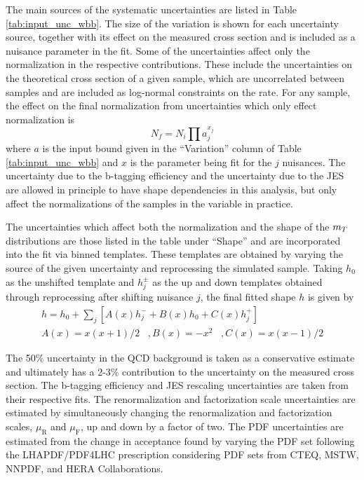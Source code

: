 The main sources of the systematic uncertainties are listed in Table \ref{tab:input_unc_wbb}.
The size of the variation is shown for each uncertainty source,
 together with its effect on the measured cross section
 and is included as a nuisance parameter in the fit.
Some of the uncertainties affect
 only the normalization in the respective contributions.
These include the uncertainties on the
 theoretical cross section of a given sample,
 which are uncorrelated between samples
 and are included as log-normal constraints on the rate.
For any sample, the effect on the final normalization
 from uncertainties which only effect normalization is 
\begin{equation}\label{eq:fitnorm}
N_f = N_i \prod a_{j}^{x_j}
\end{equation}
 where $a$ is the
 input bound given in the ``Variation'' column
 of Table \ref{tab:input_unc_wbb} and $x$ is the
 parameter being fit for the $j$ nuisances.
The uncertainty due to the b-tagging efficiency
 and the uncertainty due to the JES are allowed in
 principle to have shape dependencies in this analysis,
 but only affect the normalizations of the samples
 in the \mt variable in practice.

The uncertainties which affect both the normalization and the
 shape of the $m_T$ distributions
 are those listed in
 the table under ``Shape'' and are
 incorporated into the fit via binned templates.
These templates 
 are obtained by varying the source
 of the given uncertainty and reprocessing the simulated sample.
Taking $h_0$ as the unshifted template
 and $h_j^\pm$ as the up and down templates obtained through reprocessing
 after shifting nuisance $j$, the final fitted shape $h$ is given by
\begin{align}\label{eq:fitshape}
 h = h_0 + \sum_j[A(x)h^-_j + B(x)h_0 + C(x)h^+_j]\\
 A(x) = x(x+1)/2\;\;\;,
 B(x) = -x^2\;\;\;,
 C(x) = x(x-1)/2
\end{align}


The 50\% uncertainty in the QCD background is taken as a conservative estimate
 and ultimately has a 2-3\% contribution to the uncertainty on the measured cross section.
The b-tagging efficiency and JES rescaling uncertainties
 are taken from their respective fits.
The renormalization and factorization
 scale uncertainties are estimated by simultaneously
 changing the renormalization and factorization scales,
 $\mu_{\mathrm{R}}$ and $\mu_{\mathrm{F}}$,
 up and down by a factor of two.
The PDF uncertainties are estimated from the change in
 acceptance found by varying the
 PDF set following the LHAPDF/PDF4LHC prescription
 \cite{Buckley:2014ana,Botje:2011sn,Alekhin:2011sk,Ball:2012cx}
 considering PDF sets from CTEQ, MSTW, NNPDF, and HERA Collaborations.

